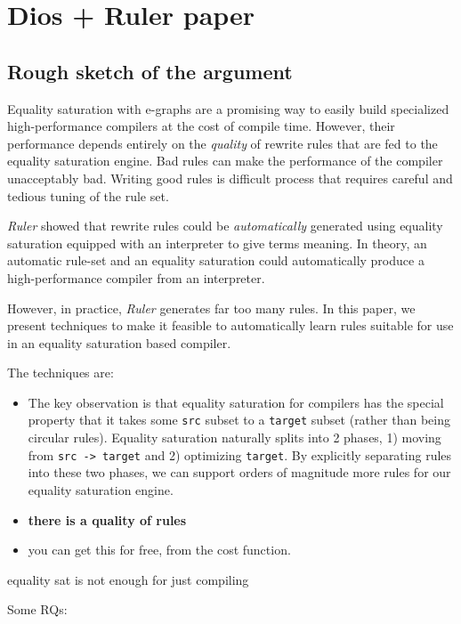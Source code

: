 \documentclass[11pt]{article}
\author{Samuel Thomas}
\date{\today}
\title{}
\begin{document}
\tableofcontents

\section{Dios + Ruler paper}
\label{sec:orgf8ab5b9}

\subsection{Rough sketch of the argument}
\label{sec:orgbc72fef}

Equality saturation with e-graphs are a promising way to easily build specialized high-performance compilers at the cost of compile time. However, their performance depends entirely on the \emph{quality} of rewrite rules that are fed to the equality saturation engine. Bad rules can make the performance of the compiler unacceptably bad. Writing good rules is difficult process that requires careful and tedious tuning of the rule set.

\emph{Ruler} showed that rewrite rules could be \emph{automatically} generated using equality saturation equipped with an interpreter to give terms meaning. In theory, an automatic rule-set and an equality saturation could automatically produce a high-performance compiler from an interpreter.

However, in practice, \emph{Ruler} generates far too many rules. In this paper, we present techniques to make it feasible to automatically learn rules suitable for use in an equality saturation based compiler.

The techniques are:
\begin{itemize}
\item The key observation is that equality saturation for compilers has the special property that it takes some \texttt{src} subset to a \texttt{target} subset (rather than being circular rules). Equality saturation naturally splits into 2 phases, 1) moving from \texttt{src -> target} and 2) optimizing \texttt{target}. By explicitly separating rules into these two phases, we can support orders of magnitude more rules for our equality saturation engine.
\item \textbf{there is a quality of rules}
\item you can get this for free, from the cost function.
\end{itemize}

equality sat is not enough for just compiling


Some RQs:
\end{document}
